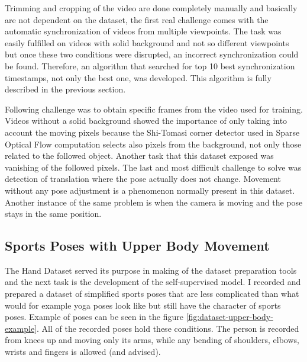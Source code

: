 Trimming and cropping of the video are done completely manually and basically are not dependent on the dataset, the first real challenge comes with the automatic synchronization of videos from multiple viewpoints. The task was easily fulfilled on videos with solid background and not so different viewpoints but once these two conditions were disrupted, an incorrect synchronization could be found. Therefore, an algorithm that searched for top 10 best synchronization timestamps, not only the best one, was developed. This algorithm is fully described in the previous section.

Following challenge was to obtain specific frames from the video used for training. Videos without a solid background showed the importance of only taking into account the moving pixels because the Shi-Tomasi corner detector used in Sparse Optical Flow computation selects also pixels from the background, not only those related to the followed object. Another task that this dataset exposed was vanishing of the followed pixels. The last and most difficult challenge to solve was detection of translation where the pose actually does not change. Movement without any pose adjustment is a phenomenon normally present in this dataset. Another instance of the same problem is when the camera is moving and the pose stays in the same position.

\subsection{\label{sec:dataset-upper-body}Sports Poses with Upper Body Movement}

The Hand Dataset served its purpose in making of the dataset preparation tools and the next task is the development of the self-supervised model. I recorded and prepared a dataset of simplified sports poses that are less complicated than what would for example yoga poses look like but still have the character of sports poses. Example of poses can be seen in the figure \ref{fig:dataset-upper-body-example}. All of the recorded poses hold these conditions. The person is recorded from knees up and moving only its arms, while any bending of shoulders, elbows, wrists and fingers is allowed (and advised).

